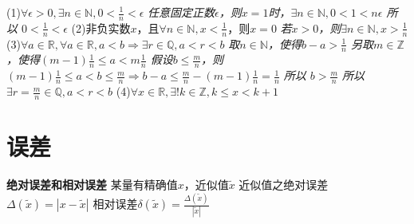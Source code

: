 \documentclass[11pt]{article}
\begin{document}
(1)$\forall\epsilon>0, \exists n\in\mathbb{N}, 0<\frac{1}{n}<\epsilon$
\newline
\textit{任意固定正数$\epsilon$，则$x=1$时，$\exists n\in\mathbb{N}, 0<1<n \epsilon$
\newline
所以 $0<\frac{1}{n}<\epsilon$}
\newline
(2)非负实数$x$，且$\forall n\in\mathbb{N}, x<\frac{1}{n}$，则$x=0$
\newline
\textit{若$x>0$，则$\exists n\in\mathbb{N}, x>\frac{1}{n}$}
\newline
(3)$\forall a\in\mathbb{R}, \forall a\in\mathbb{R}, a<b \Rightarrow \exists r\in\mathbb{Q}, a<r<b$
\newline
\textit{取$n\in\mathbb{N}$，使得$b-a>\frac{1}{n}$
\newline
另取$m\in\mathbb{Z}$，使得$(m-1)\frac{1}{n} \le a<m\frac{1}{n}$
\newline
假设$b\le \frac{m}{n}$，则$(m-1)\frac{1}{n}\le a<b \le\frac{m}{n}\Rightarrow b-a \le \frac{m}{n}-(m-1)\frac{1}{n}=\frac{1}{n}$
\newline
所以 $b>\frac{m}{n}$
\newline
所以 $\exists r=\frac{m}{n} \in\mathbb{Q},a<r<b$}
\newline
(4)$\forall x\in\mathbb{R}, \exists!k\in\mathbb{Z}, k\le x<k+1$
\newline

\section{误差}
\textbf{绝对误差和相对误差}
\newline
某量有精确值$x$，近似值$\tilde{x}$
\newline
近似值之绝对误差$\Delta(\tilde{x})=|x-\tilde{x}|$
\newline
相对误差$\delta(\tilde{x})=\frac{\Delta(\tilde{x})}{|\tilde{x}|}$
\newline
\end{document}
